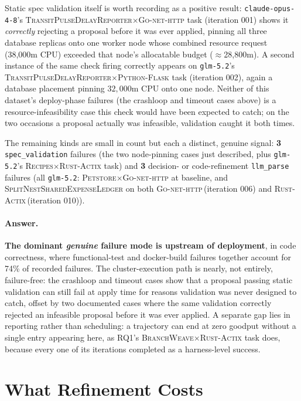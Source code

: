 Static spec validation itself is worth recording as a positive result:
\texttt{claude-opus-4-8}'s \textsc{TransitPulseDelayReporter}$\times$\textsc{Go-net-http}
task (iteration 001) shows it \emph{correctly} rejecting a proposal before
it was ever applied, pinning all three database replicas onto one worker
node whose combined resource request (38{,}000m CPU) exceeded that node's
allocatable budget ($\approx${}28{,}800m). A second instance of the same
check firing correctly appears on \texttt{glm-5.2}'s
\textsc{TransitPulseDelayReporter}$\times$\textsc{Python-Flask} task
(iteration 002), again a database placement pinning $32{,}000$m CPU onto
one node. Neither of this dataset's deploy-phase failures (the crashloop
and timeout cases above) is a resource-infeasibility case this check would
have been expected to catch; on the two occasions a proposal actually was
infeasible, validation caught it both times.

The remaining kinds are small in count but each a distinct, genuine
signal: \textbf{3} \texttt{spec\_validation} failures (the two node-pinning
cases just described, plus \texttt{glm-5.2}'s
\textsc{Recipes}$\times$\textsc{Rust-Actix} task) and \textbf{3}
decision- or code-refinement \texttt{llm\_parse} failures (all
\texttt{glm-5.2}: \textsc{Petstore}$\times$\textsc{Go-net-http} at baseline,
and \textsc{SplitNestSharedExpenseLedger} on both
\textsc{Go-net-http}\,(iteration 006) and \textsc{Rust-Actix}\,(iteration
010)).

\paragraph{Answer.}
\textbf{The dominant \emph{genuine} failure mode is upstream of
deployment}, in code correctness, where functional-test and docker-build
failures together account for 74\% of recorded failures. The
cluster-execution path is nearly, not entirely, failure-free: the
crashloop and timeout cases show that a proposal passing static
validation can still fail at apply time for reasons validation was never
designed to catch, offset by two documented cases where the same
validation correctly rejected an infeasible proposal before it was ever
applied. A separate gap lies in reporting rather than scheduling: a
trajectory can end at zero goodput without a single entry appearing here,
as RQ1's \textsc{BranchWeave}$\times$\textsc{Rust-Actix} task does,
because every one of its iterations completed as a harness-level success.


\section{What Refinement Costs}
\label{sec:results-cost}

